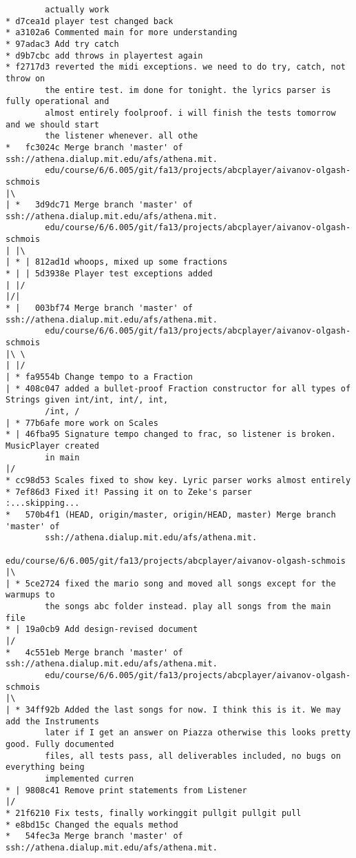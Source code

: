 \documentclass[12pt]{book}
\begin{document}
\begin{Verbatim}
        actually work
* d7cea1d player test changed back
* a3102a6 Commented main for more understanding
* 97adac3 Add try catch
* d9b7cbc add throws in playertest again
* f2717d3 reverted the midi exceptions. we need to do try, catch, not throw on 
        the entire test. im done for tonight. the lyrics parser is fully operational and 
        almost entirely foolproof. i will finish the tests tomorrow and we should start 
        the listener whenever. all othe
*   fc3024c Merge branch 'master' of ssh://athena.dialup.mit.edu/afs/athena.mit.
        edu/course/6/6.005/git/fa13/projects/abcplayer/aivanov-olgash-schmois
|\
| *   3d9dc71 Merge branch 'master' of ssh://athena.dialup.mit.edu/afs/athena.mit.
        edu/course/6/6.005/git/fa13/projects/abcplayer/aivanov-olgash-schmois
| |\
| * | 812ad1d whoops, mixed up some fractions
* | | 5d3938e Player test exceptions added
| |/
|/|
* |   003bf74 Merge branch 'master' of ssh://athena.dialup.mit.edu/afs/athena.mit.
        edu/course/6/6.005/git/fa13/projects/abcplayer/aivanov-olgash-schmois
|\ \
| |/
| * fa9554b Change tempo to a Fraction
| * 408c047 added a bullet-proof Fraction constructor for all types of Strings given int/int, int/, int, 
        /int, /
| * 77b6afe more work on Scales
* | 46fba95 Signature tempo changed to frac, so listener is broken. MusicPlayer created 
        in main
|/
* cc98d53 Scales fixed to show key. Lyric parser works almost entirely
* 7ef86d3 Fixed it! Passing it on to Zeke's parser
:...skipping...
*   570b4f1 (HEAD, origin/master, origin/HEAD, master) Merge branch 'master' of 
        ssh://athena.dialup.mit.edu/afs/athena.mit.
                edu/course/6/6.005/git/fa13/projects/abcplayer/aivanov-olgash-schmois
|\
| * 5ce2724 fixed the mario song and moved all songs except for the warmups to 
        the songs abc folder instead. play all songs from the main file
* | 19a0cb9 Add design-revised document
|/
*   4c551eb Merge branch 'master' of ssh://athena.dialup.mit.edu/afs/athena.mit.
        edu/course/6/6.005/git/fa13/projects/abcplayer/aivanov-olgash-schmois
|\
| * 34ff92b Added the last songs for now. I think this is it. We may add the Instruments 
        later if I get an answer on Piazza otherwise this looks pretty good. Fully documented 
        files, all tests pass, all deliverables included, no bugs on everything being 
        implemented curren
* | 9808c41 Remove print statements from Listener
|/
* 21f6210 Fix tests, finally workinggit pullgit pullgit pull
* e8bd15c Changed the equals method
*   54fec3a Merge branch 'master' of ssh://athena.dialup.mit.edu/afs/athena.mit.

\end{Verbatim}
\end{document}
